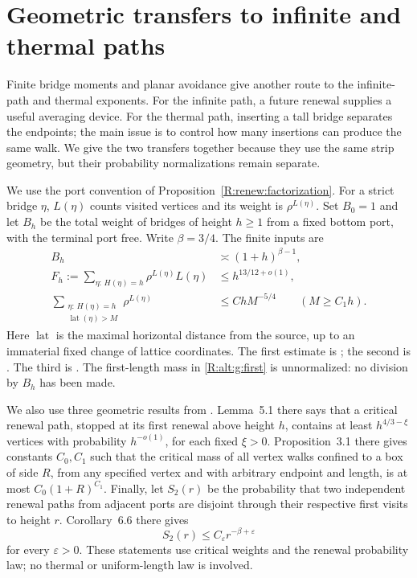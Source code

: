 \section{Geometric transfers to infinite and thermal paths}
\label{R:alt:g:section}

Finite bridge moments and planar avoidance give another route to the infinite-path
and thermal exponents. For the infinite path, a future renewal supplies
a useful averaging device. For the thermal path, inserting a tall bridge
separates the endpoints; the main issue is to control how many insertions
can produce the same walk. We give the two transfers together because they
use the same strip geometry, but their probability normalizations remain
separate.

We use the port convention of Proposition~\ref{R:renew:factorization}.
For a strict bridge $\eta$, $L(\eta)$ counts visited vertices and its weight
is $\rho^{L(\eta)}$. Set $B_0=1$ and let $B_h$ be the total weight of
bridges of height $h\ge1$ from a fixed bottom port, with the terminal
port free. Write $\beta=3/4$. The finite inputs are
\begin{align}
 B_h&\asymp(1+h)^{\beta-1},\label{R:alt:g:strip}\\
 F_h:=\sum_{\eta:\,H(\eta)=h}\rho^{L(\eta)}L(\eta)
   &\le h^{13/12+o(1)},\label{R:alt:g:first}\\
 \sum_{\substack{\eta:\,H(\eta)=h\\
                 \operatorname{lat}(\eta)>M}}
       \rho^{L(\eta)}&\le ChM^{-5/4}\qquad(M\ge C_1h).
       \label{R:alt:g:localization}
\end{align}
Here $\operatorname{lat}$ is the maximal horizontal distance from the
source, up to an immaterial fixed change of lattice coordinates.
The first estimate is \cite[Theorem~1.1]{Strip2026}; the second
is \cite[Proposition~11.5]{Nesting2026}. The third
is \cite[Lemma~4.1]{Geometry2026}. The first-length mass in \eqref{R:alt:g:first} is unnormalized: no division by $B_h$ has been made.

We also use three geometric results from \cite{Geometry2026}.
Lemma~5.1 there says that a critical renewal path, stopped at its
first renewal above height $h$, contains at least $h^{4/3-\xi}$ vertices
with probability $h^{-o(1)}$, for each fixed $\xi>0$. Proposition~3.1 there gives constants $C_0,C_1$ such that the
critical mass of all vertex walks confined to a box of side $R$, from
any specified vertex and with arbitrary endpoint and length, is at most
$C_0(1+R)^{C_1}$. Finally, let $S_2(r)$ be the probability that two independent renewal
paths from adjacent ports are disjoint through their respective first
visits to height $r$. Corollary~6.6 there gives
\begin{equation}\label{R:alt:g:avoidance}
 S_2(r)\le C_\varepsilon r^{-\beta+\varepsilon}
\end{equation}
for every $\varepsilon>0$. These statements use critical weights and the renewal probability law;
no thermal or uniform-length law is involved.

